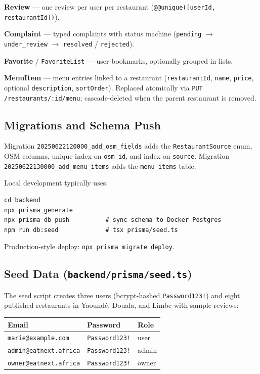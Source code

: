 \documentclass[11pt,a4paper]{article}
\begin{document}
\textbf{Review} --- one review per user per restaurant (\texttt{@@unique([userId, restaurantId])}).

\textbf{Complaint} --- typed complaints with status machine (\texttt{pending} $\rightarrow$
\texttt{under\_review} $\rightarrow$ \texttt{resolved} / \texttt{rejected}).

\textbf{Favorite} / \texttt{FavoriteList} --- user bookmarks, optionally grouped in lists.

\textbf{MenuItem} --- menu entries linked to a restaurant (\texttt{restaurantId}, \texttt{name},
\texttt{price}, optional \texttt{description}, \texttt{sortOrder}). Replaced atomically via
\texttt{PUT /restaurants/:id/menu}; cascade-deleted when the parent restaurant is removed.

\subsection{Migrations and Schema Push}

Migration \texttt{20250622120000\_add\_osm\_fields} adds the \texttt{RestaurantSource} enum,
OSM columns, unique index on \texttt{osm\_id}, and index on \texttt{source}.
Migration \texttt{20250622130000\_add\_menu\_items} adds the \texttt{menu\_items} table.

Local development typically uses:

\begin{verbatim}
cd backend
npx prisma generate
npx prisma db push          # sync schema to Docker Postgres
npm run db:seed             # tsx prisma/seed.ts
\end{verbatim}

Production-style deploy: \texttt{npx prisma migrate deploy}.

\subsection{Seed Data (\texttt{backend/prisma/seed.ts})}

The seed script creates three users (bcrypt-hashed \texttt{Password123!}) and eight
published restaurants in Yaound\'e, Douala, and Limbe with sample reviews:

\begin{tabular}{@{}lll@{}}
\toprule
\textbf{Email} & \textbf{Password} & \textbf{Role} \\
\midrule
\texttt{marie@example.com} & \texttt{Password123!} & user \\
\texttt{admin@eatnext.africa} & \texttt{Password123!} & admin \\
\texttt{owner@eatnext.africa} & \texttt{Password123!} & owner \\
\bottomrule
\end{tabular}
\end{document}
